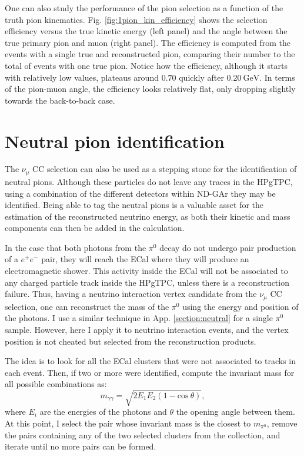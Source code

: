One can also study the performance of the pion selection as a function of the truth pion kinematics. Fig. \ref{fig:1pion_kin_efficiency} shows the selection efficiency versus the true kinetic energy (left panel) and the angle between the true primary pion and muon (right panel). The efficiency is computed from the events with a single true and reconstructed pion, comparing their number to the total of events with one true pion. Notice how the efficiency, although it starts with relatively low values, plateaus around $0.70$ quickly after $0.20~\mathrm{GeV}$. In terms of the pion-muon angle, the efficiency looks relatively flat, only dropping slightly towards the back-to-back case.

\section{Neutral pion identification}
\label{sec:gar_neutral_pions}

The $\nu_{\mu}$ CC selection can also be used as a stepping stone for the identification of neutral pions. Although these particles do not leave any traces in the HPgTPC, using a combination of the different detectors within ND-GAr they may be identified. Being able to tag the neutral pions is a valuable asset for the estimation of the reconstructed neutrino energy, as both their kinetic and mass components can then be added in the calculation.

In the case that both photons from the $\pi^{0}$ decay do not undergo pair production of a $e^{+}e^{-}$ pair, they will reach the ECal where they will produce an electromagnetic shower. This activity inside the ECal will not be associated to any charged particle track inside the HPgTPC, unless there is a reconstruction failure. Thus, having a neutrino interaction vertex candidate from the $\nu_{\mu}$ CC selection, one can reconstruct the mass of the $\pi^{0}$ using the energy and position of the photons. I use a similar technique in App. \ref{section:neutral} for a single $\pi^{0}$ sample. However, here I apply it to neutrino interaction events, and the vertex position is not cheated but selected from the reconstruction products.

The idea is to look for all the ECal clusters that were not associated to tracks in each event. Then, if two or more were identified, compute the invariant mass for all possible combinations as:
\begin{equation}
	m_{\gamma\gamma} = \sqrt{2E_{1}E_{2}(1-\mathrm{cos} \ \theta)},
\end{equation}
where $E_{i}$ are the energies of the photons and $\theta$ the opening angle between them. At this point, I select the pair whose invariant mass is the closest to $m_{\pi^{0}}$, remove the pairs containing any of the two selected clusters from the collection, and iterate until no more pairs can be formed.

